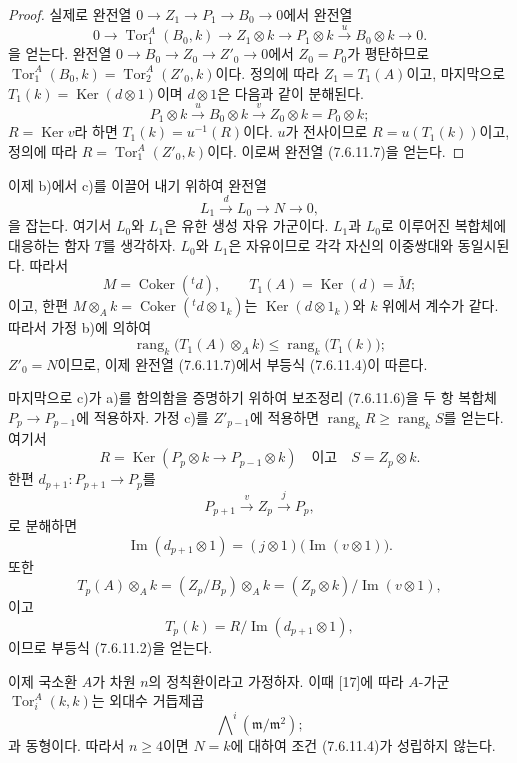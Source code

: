 \begin{remark}[7.6.11]
\begin{proof}
실제로 완전열 $0\to Z_1\to P_1\to B_0\to0$에서 완전열
\[
  0\longrightarrow\operatorname{Tor}_1^A(B_0,k)
  \longrightarrow Z_1\otimes k
  \longrightarrow P_1\otimes k
  \xrightarrow{u}B_0\otimes k
  \longrightarrow0.
\]
을 얻는다. 완전열 $0\to B_0\to Z_0\to Z'_0\to0$에서
$Z_0=P_0$가 평탄하므로
$\operatorname{Tor}_1^A(B_0,k)=\operatorname{Tor}_2^A(Z'_0,k)$이다.
정의에 따라 $Z_1=T_1(A)$이고, 마지막으로
$T_1(k)=\operatorname{Ker}(d\otimes1)$이며 $d\otimes1$은 다음과 같이
분해된다.
\[
  P_1\otimes k
  \xrightarrow{u}B_0\otimes k
  \xrightarrow{v}Z_0\otimes k
  =P_0\otimes k;
\]
$R=\operatorname{Ker}v$라 하면 $T_1(k)=u^{-1}(R)$이다. $u$가
전사이므로 $R=u(T_1(k))$이고, 정의에 따라
$R=\operatorname{Tor}_1^A(Z'_0,k)$이다. 이로써 완전열 (7.6.11.7)을
얻는다.
\end{proof}

이제 b)에서 c)를 이끌어 내기 위하여 완전열
\[
  L_1\xrightarrow{d}L_0\longrightarrow N\longrightarrow0,
\]
을 잡는다. 여기서 $L_0$와 $L_1$은 유한 생성 자유 가군이다.
$L_1$과 $L_0$로 이루어진 복합체에 대응하는 함자 $T$를 생각하자.
$L_0$와 $L_1$은 자유이므로 각각 자신의 이중쌍대와 동일시된다. 따라서
\[
  M=\operatorname{Coker}({}^t d),
  \qquad
  T_1(A)=\operatorname{Ker}(d)=\check M;
\]
이고, 한편
$M\otimes_A k=\operatorname{Coker}({}^t d\otimes1_k)$는
$\operatorname{Ker}(d\otimes1_k)$와 $k$ 위에서 계수가 같다. 따라서
가정 b)에 의하여
\[
  \operatorname{rang}_k\bigl(T_1(A)\otimes_A k\bigr)
  \leq
  \operatorname{rang}_k\bigl(T_1(k)\bigr);
\]
$Z'_0=N$이므로, 이제 완전열 (7.6.11.7)에서 부등식 (7.6.11.4)이
따른다.

마지막으로 c)가 a)를 함의함을 증명하기 위하여 보조정리 (7.6.11.6)을
두 항 복합체 $P_p\longrightarrow P_{p-1}$에 적용하자. 가정 c)를
$Z'_{p-1}$에 적용하면 $\operatorname{rang}_kR\geq
\operatorname{rang}_kS$를 얻는다. 여기서
\[
  R=\operatorname{Ker}(P_p\otimes k\longrightarrow P_{p-1}\otimes k)
  \quad\text{이고}\quad
  S=Z_p\otimes k.
\]
한편 $d_{p+1}:P_{p+1}\to P_p$를
\[
  P_{p+1}\xrightarrow{v}Z_p\xrightarrow{j}P_p,
\]
로 분해하면
\[
  \operatorname{Im}(d_{p+1}\otimes1)
  =
  (j\otimes1)\bigl(\operatorname{Im}(v\otimes1)\bigr).
\]
또한
\[
  T_p(A)\otimes_A k
  =(Z_p/B_p)\otimes_A k
  =(Z_p\otimes k)/\operatorname{Im}(v\otimes1),
\]
이고
\[
  T_p(k)=R/\operatorname{Im}(d_{p+1}\otimes1),
\]
이므로 부등식 (7.6.11.2)을 얻는다.

이제 국소환 $A$가 차원 $n$의 정칙환이라고 가정하자. 이때 [17]에 따라
$A$-가군 $\operatorname{Tor}_i^A(k,k)$는 외대수 거듭제곱
\[
  \bigwedge\nolimits^i(\mathfrak m/\mathfrak m^2);
\]
과 동형이다. 따라서 $n\geq4$이면 $N=k$에 대하여 조건 (7.6.11.4)가
성립하지 않는다.


\end{remark}
